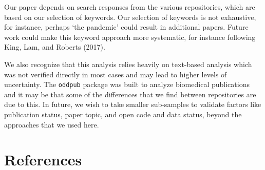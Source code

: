 \documentclass[
]{article}
\begin{document}
Our paper depends on search responses from the various repositories, which are based on our selection of keywords. Our selection of keywords is not exhaustive, for instance, perhaps `the pandemic' could result in additional papers. Future work could make this keyword approach more systematic, for instance following King, Lam, and Roberts (2017).

We also recognize that this analysis relies heavily on text-based analysis which was not verified directly in most cases and may lead to higher levels of uncertainty. The \texttt{oddpub} package was built to analyze biomedical publications and it may be that some of the differences that we find between repositories are due to this. In future, we wish to take smaller sub-samples to validate factors like publication status, paper topic, and open code and data status, beyond the approaches that we used here.

\newpage

\hypertarget{references}{%
\section*{References}\label{references}}
\end{document}
